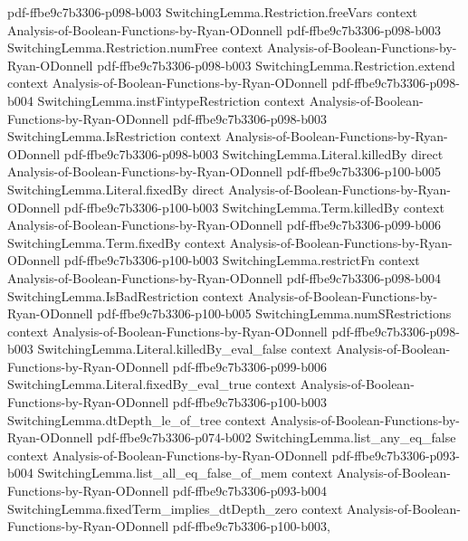 \begin{theorem}
  {pdf-ffbe9c7b3306-p098-b003}
\proofstep
  {SwitchingLemma.Restriction.freeVars}
  {context}
  {Analysis-of-Boolean-Functions-by-Ryan-ODonnell}
  {pdf-ffbe9c7b3306-p098-b003}
\proofstep
  {SwitchingLemma.Restriction.numFree}
  {context}
  {Analysis-of-Boolean-Functions-by-Ryan-ODonnell}
  {pdf-ffbe9c7b3306-p098-b003}
\proofstep
  {SwitchingLemma.Restriction.extend}
  {context}
  {Analysis-of-Boolean-Functions-by-Ryan-ODonnell}
  {pdf-ffbe9c7b3306-p098-b004}
\proofstep
  {SwitchingLemma.instFintypeRestriction}
  {context}
  {Analysis-of-Boolean-Functions-by-Ryan-ODonnell}
  {pdf-ffbe9c7b3306-p098-b003}
\proofstep
  {SwitchingLemma.IsRestriction}
  {context}
  {Analysis-of-Boolean-Functions-by-Ryan-ODonnell}
  {pdf-ffbe9c7b3306-p098-b003}
\proofstep
  {SwitchingLemma.Literal.killedBy}
  {direct}
  {Analysis-of-Boolean-Functions-by-Ryan-ODonnell}
  {pdf-ffbe9c7b3306-p100-b005}
\proofstep
  {SwitchingLemma.Literal.fixedBy}
  {direct}
  {Analysis-of-Boolean-Functions-by-Ryan-ODonnell}
  {pdf-ffbe9c7b3306-p100-b003}
\proofstep
  {SwitchingLemma.Term.killedBy}
  {context}
  {Analysis-of-Boolean-Functions-by-Ryan-ODonnell}
  {pdf-ffbe9c7b3306-p099-b006}
\proofstep
  {SwitchingLemma.Term.fixedBy}
  {context}
  {Analysis-of-Boolean-Functions-by-Ryan-ODonnell}
  {pdf-ffbe9c7b3306-p100-b003}
\proofstep
  {SwitchingLemma.restrictFn}
  {context}
  {Analysis-of-Boolean-Functions-by-Ryan-ODonnell}
  {pdf-ffbe9c7b3306-p098-b004}
\proofstep
  {SwitchingLemma.IsBadRestriction}
  {context}
  {Analysis-of-Boolean-Functions-by-Ryan-ODonnell}
  {pdf-ffbe9c7b3306-p100-b005}
\proofstep
  {SwitchingLemma.numSRestrictions}
  {context}
  {Analysis-of-Boolean-Functions-by-Ryan-ODonnell}
  {pdf-ffbe9c7b3306-p098-b003}
\proofstep
  {SwitchingLemma.Literal.killedBy_eval_false}
  {context}
  {Analysis-of-Boolean-Functions-by-Ryan-ODonnell}
  {pdf-ffbe9c7b3306-p099-b006}
\proofstep
  {SwitchingLemma.Literal.fixedBy_eval_true}
  {context}
  {Analysis-of-Boolean-Functions-by-Ryan-ODonnell}
  {pdf-ffbe9c7b3306-p100-b003}
\proofstep
  {SwitchingLemma.dtDepth_le_of_tree}
  {context}
  {Analysis-of-Boolean-Functions-by-Ryan-ODonnell}
  {pdf-ffbe9c7b3306-p074-b002}
\proofstep
  {SwitchingLemma.list_any_eq_false}
  {context}
  {Analysis-of-Boolean-Functions-by-Ryan-ODonnell}
  {pdf-ffbe9c7b3306-p093-b004}
\proofstep
  {SwitchingLemma.list_all_eq_false_of_mem}
  {context}
  {Analysis-of-Boolean-Functions-by-Ryan-ODonnell}
  {pdf-ffbe9c7b3306-p093-b004}
\proofstep
  {SwitchingLemma.fixedTerm_implies_dtDepth_zero}
  {context}
  {Analysis-of-Boolean-Functions-by-Ryan-ODonnell}
  {pdf-ffbe9c7b3306-p100-b003,
}
\end{theorem}

